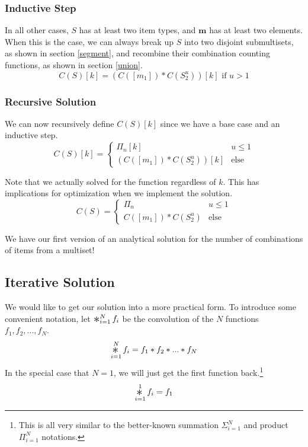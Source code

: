 \documentclass{article}
\newcommand{\Conv}{\mathop{\scalebox{1.5}{\raisebox{-0.2ex}{$\ast$}}}}%
\begin{document}
\subsubsection{Inductive Step}

In all other cases, $S$ has at least two item types, and $\bm{m}$ has at least two elements. When this is the case, we can always break up $S$ into two disjoint submultisets, as shown in section \ref{segment}, and recombine their combination counting functions, as shown in section \ref{union}.
\begin{equation}
    C(S)[k] = (C([m_1]) * C(S_2^u))[k]\text{ if } u>1
\end{equation}

\subsubsection{Recursive Solution}

We can now recursively define $C(S)[k]$ since we have a base case and an inductive step.
\begin{equation}
    C(S)[k] = \begin{cases}\Pi_n[k] & u \leq 1 \\
    (C([m_1]) * C(S_2^u))[k] & \text{else} \end{cases}
\end{equation}

Note that we actually solved for the function regardless of $k$. This has implications for optimization when we implement the solution. \begin{equation} \label{rec}
    C(S) = \begin{cases}\Pi_n & u \leq 1 \\
    C([m_1]) * C(S_2^u) & \text{else} \end{cases}
\end{equation}

We have our first version of an analytical solution for the number of combinations of items from a multiset!

\subsection{Iterative Solution}

We would like to get our solution into a more practical form. To introduce some convenient notation, let $\Conv_{i=1}^N f_i$ be the convolution of the $N$ functions $f_1, f_2, ..., f_N$. 
\begin{equation}
    \Conv_{i=1}^N f_i = f_1 * f_2 * ... * f_N
\end{equation}
In the special case that $N=1$, we will just get the first function back.\footnote{This is all very similar to the better-known summation $\Sigma_{i=1}^N$ and product $\Pi_{i=1}^N$ notations.}
\begin{equation}
    \Conv_{i=1}^1 f_i = f_1
\end{equation}
\end{document}

